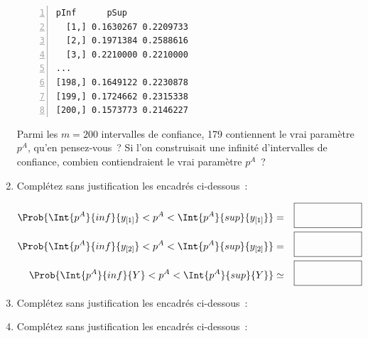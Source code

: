 \documentclass[10pt]{report}
\begin{document}
\begin{exercice}
\begin{enumerate}
\begin{Verbatim}[frame=leftline,fontfamily=tt,fontshape=n,numbers=left]
pInf      pSup
  [1,] 0.1630267 0.2209733
  [2,] 0.1971384 0.2588616
  [3,] 0.2210000 0.2210000
...
[198,] 0.1649122 0.2230878
[199,] 0.1724662 0.2315338
[200,] 0.1573773 0.2146227
\end{Verbatim}


Parmi les $m=200$ intervalles de confiance, 179 contiennent le vrai paramètre $p^A$, qu'en pensez-vous~? Si l'on construisait une infinité d'intervalles de confiance, combien contiendraient le vrai paramètre $p^A$~?



\item Complétez sans justification les encadrés ci-dessous~: 

\begin{eqnarray}
\Prob{ \Int{p^A}{inf}{y_{[1]}} < p^A < \Int{p^A}{sup}{y_{[1]}} } &=&  \fbox{ \phantom{\textbf{\huge pastis}}} \nonumber \\
\Prob{ \Int{p^A}{inf}{y_{[2]}} < p^A < \Int{p^A}{sup}{y_{[2]}} } &=&  \fbox{ \phantom{\textbf{\huge pastis}}} \nonumber \\ 
\Prob{ \Int{p^A}{inf}{Y} < p^A < \Int{p^A}{sup}{Y} } &\simeq&  \fbox{ \phantom{\textbf{\huge pastis}}} \nonumber
\end{eqnarray}

\item Complétez sans justification les encadrés ci-dessous~:
\item Complétez sans justification les encadrés ci-dessous~:
\end{enumerate}
\end{exercice}
\end{document}
